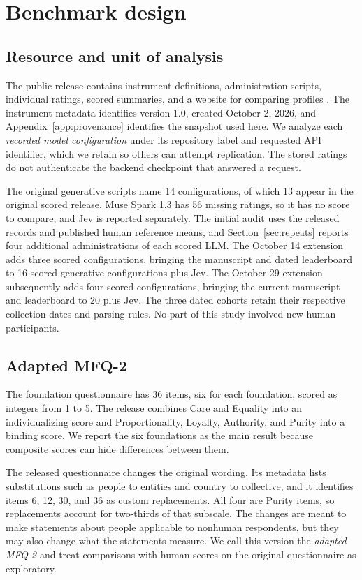 \documentclass[11pt]{article}
\begin{document}
\section{Benchmark design}
\subsection{Resource and unit of analysis}
The public release contains instrument definitions, administration scripts, individual ratings, scored summaries, and a website for comparing profiles \cite{resource}. The instrument metadata identifies version 1.0, created October 2, 2026, and Appendix~\ref{app:provenance} identifies the snapshot used here. We analyze each \emph{recorded model configuration} under its repository label and requested API identifier, which we retain so others can attempt replication. The stored ratings do not authenticate the backend checkpoint that answered a request.

The original generative scripts name 14 configurations, of which 13 appear in the original scored release. Muse Spark 1.3 has 56 missing ratings, so it has no score to compare, and Jev is reported separately. The initial audit uses the released records and published human reference means, and Section~\ref{sec:repeats} reports four additional administrations of each scored LLM. The October 14 extension adds three scored configurations, bringing the manuscript and dated leaderboard to 16 scored generative configurations plus Jev. The October 29 extension subsequently adds four scored configurations, bringing the current manuscript and leaderboard to 20 plus Jev. The three dated cohorts retain their respective collection dates and parsing rules. No part of this study involved new human participants.

\subsection{Adapted MFQ-2}
The foundation questionnaire has 36 items, six for each foundation, scored as integers from 1 to 5. The release combines Care and Equality into an individualizing score and Proportionality, Loyalty, Authority, and Purity into a binding score. We report the six foundations as the main result because composite scores can hide differences between them.

The released questionnaire changes the original wording. Its metadata lists substitutions such as people to entities and country to collective, and it identifies items 6, 12, 30, and 36 as custom replacements. All four are Purity items, so replacements account for two-thirds of that subscale. The changes are meant to make statements about people applicable to nonhuman respondents, but they may also change what the statements measure. We call this version the \emph{adapted MFQ-2} and treat comparisons with human scores on the original questionnaire as exploratory.
\end{document}
